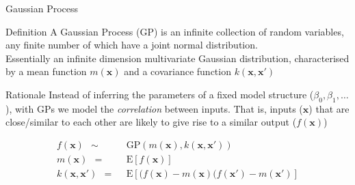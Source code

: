 \documentclass[pdf]{beamer}
\begin{document}

\begin{frame}{Gaussian Process}

\begin{block}{Definition}
A Gaussian Process (GP) is an infinite collection of random variables, any finite number of which have a joint normal distribution.
\\
Essentially an infinite dimension multivariate Gaussian distribution, characterised by a mean function $m(\mathbf{x})$ and a covariance function $k(\mathbf{x},\mathbf{x}')$ 
\end{block}

\begin{block}{Rationale}
Instead of inferring the parameters of a fixed model structure ($\beta_0,\beta_1,\ldots$), with GPs we model the \textit{correlation}
between inputs. That is, inputs ($\mathbf{x}$) that are close/similar to each other are likely to give rise to a similar
output ($f(\mathbf{x})$)  
\end{block}
\vspace{-1cm}
\begin{align}
f(\mathbf{x})\ \ \sim\ \ &\mathrm{GP}(m(\mathbf{x}),k(\mathbf{x},\mathbf{x}'))\nonumber\\
m(\mathbf{x})\ \ =\ \ &\mathrm{E}[f(\mathbf{x})]\nonumber\\
k(\mathbf{x},\mathbf{x}')\ \ =\ \ &\mathrm{E}[(f(\mathbf{x})-m(\mathbf{x})(f(\mathbf{x}')-m(\mathbf{x}')]\nonumber
\end{align} 

\end{frame}
\end{document}
